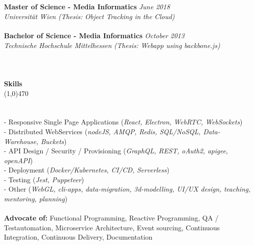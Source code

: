 \documentclass[10pt]{article} %
\begin{document}
\\\\
\noindent
{\bf Master of Science - Media Informatics} \hfill \textit{June 2018} \\ 
\textit{Universität Wien (Thesis: Object Tracking in the Cloud)}\\\\
\noindent
{\bf Bachelor of Science - Media Informatics} \hfill \textit{October 2013} \\
\textit{Technische Hochschule Mittelhessen (Thesis: Webapp using backbone.js)}\\
\\
\\\\
{\Large \bf Skills}\\
\line(1,0){470}\\
\\\\
\noindent
- Responsive Single Page Applications (\textit{React, Electron, WebRTC, WebSockets}) \\
- Distributed WebServices (\textit{nodeJS, AMQP, Redis, SQL/NoSQL, Data-Warehouse, Buckets}) \\
- API Design / Security / Provisioning (\textit{GraphQL, REST, oAuth2, apigee, openAPI}) \\
- Deployment (\textit{Docker/Kubernetes, CI/CD, Serverless}) \\
- Testing (\textit{Jest, Puppeteer}) \\
- Other (\textit{WebGL, cli-apps, data-migration, 3d-modelling, UI/UX design, teaching, mentoring, planning}) \\\\
\noindent
{\bf Advocate of:} Functional Programming, Reactive Programming, QA / Testautomation, Microservice Architecture, Event sourcing, Continuous Integration, Continuous Delivery, Documentation \\\\\
\end{document}
